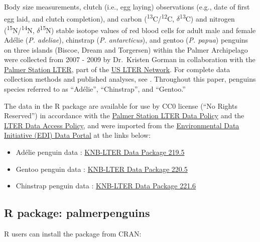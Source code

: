 Body size measurements, clutch (i.e., egg laying) observations (e.g.,
date of first egg laid, and clutch completion), and carbon
(\textsuperscript{13}C/\textsuperscript{12}C,
\(\delta\)\textsuperscript{13}C) and nitrogen
(\textsuperscript{15}N/\textsuperscript{14}N,
\(\delta\)\textsuperscript{15}N) stable isotope values of red blood
cells for adult male and female Adélie (\emph{P. adeliae}), chinstrap
(\emph{P. antarcticus}), and gentoo (\emph{P. papua}) penguins on three
islands (Biscoe, Dream and Torgersen) within the Palmer Archipelago were
collected from 2007 - 2009 by Dr.~Kristen Gorman in collaboration with
the \href{https://pal.lternet.edu/}{Palmer Station LTER}, part of the
\href{https://lternet.edu/}{US LTER Network}. For complete data
collection methods and published analyses, see
\citet{gorman_ecological_2014}. Throughout this paper, penguins species
referred to as ``Adélie'', ``Chinstrap'', and ``Gentoo.''

The data in the  R package are available for use
by CC0 license (``No Rights Reserved'') in accordance with the
\href{https://pal.lternet.edu/data/policies}{Palmer Station LTER Data
Policy} and the \href{https://lternet.edu/data-access-policy/}{LTER Data
Access Policy}, and were imported from the
\href{https://environmentaldatainitiative.org/}{Environmental Data
Initiative (EDI) Data Portal} at the links below:

\begin{itemize}
\tightlist
\item
  Adélie penguin data \citep{lter_structural_2020}:
  \href{https://portal.edirepository.org/nis/mapbrowse?packageid=knb-lter-pal.219.5}{KNB-LTER
  Data Package 219.5}
\item
  Gentoo penguin data \citep{lter_structural_2020-1}:
  \href{https://portal.edirepository.org/nis/mapbrowse?packageid=knb-lter-pal.220.5}{KNB-LTER
  Data Package 220.5}
\item
  Chinstrap penguin data \citep{lter_structural_2020-2}:
  \href{https://portal.edirepository.org/nis/mapbrowse?packageid=knb-lter-pal.221.6}{KNB-LTER
  Data Package 221.6}
\end{itemize}

\hypertarget{r-package-palmerpenguins}{%
\subsection{R package: palmerpenguins}\label{r-package-palmerpenguins}}

R users can install the  package from CRAN:


